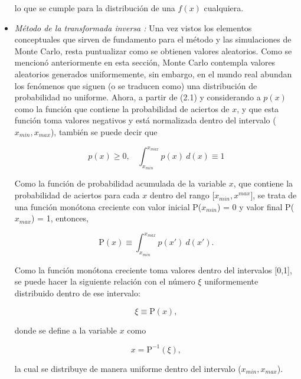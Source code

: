 \begin{itemize}
    lo que se cumple para la distribución de una $f(x)$ cualquiera.
    
    \item \textit{Método de la transformada inversa \citep{gonzalez2010}:}
    \newline
    Una vez vistos los elementos conceptuales que sirven de fundamento para el método y las simulaciones de Monte Carlo, resta puntualizar como se obtienen valores aleatorios. Como se mencionó anteriormente en esta sección, Monte Carlo contempla valores aleatorios generados uniformemente, sin embargo, en el mundo real abundan los fenómenos que siguen (o se traducen como) una distribución de probabilidad no uniforme. Ahora, a partir de (2.1) y considerando a $p(x)$ como la función que contiene la probabilidad de aciertos de $x$, y que esta función toma valores negativos y está normalizada dentro del intervalo ($x_{min}, x_{max}$), también se puede decir que
    
    \begin{equation}
        p(x) \geq 0, ~~~~ \int_{x_{min}}^{x_{max}} p(x)~d(x) \equiv 1
    \end{equation}
    
    Como la función de probabilidad acumulada de la variable $x$, que contiene la probabilidad de aciertos para cada $x$ dentro del rango [$x_{min}, x^{max}$], se trata de una función monótona creciente con valor inicial P($x_{min}$) = 0 y valor final P($x_{max}$) = 1, entonces,
    
    \begin{equation}
        \text{P}(x) \equiv \int_{x_{min}}^{x_{max}} p(x')~d(x').
    \end{equation}
    
    Como la función monótona creciente toma valores dentro del intervalos [0,1], se puede hacer la siguiente relación con el número $\xi$ uniformemente distribuido dentro de ese intervalo:
    
    \begin{equation}
        \xi \equiv \text{P}(x),
    \end{equation}
    
    donde se define a la variable $x$ como
    
    \begin{equation}
        x = \text{P}^{-1}(\xi),
    \end{equation}
    
    la cual se distribuye de manera uniforme dentro del intervalo ($x_{min}, x_{max}$).
    

\end{itemize}
